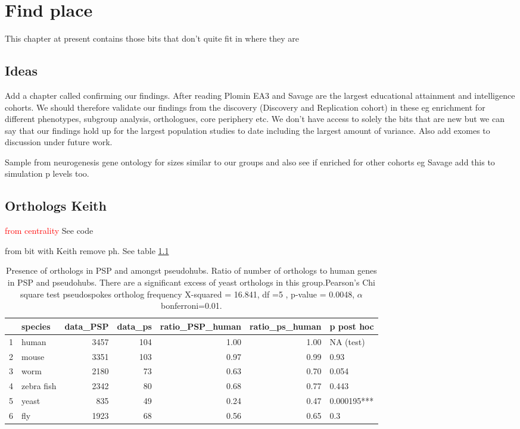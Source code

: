 \chapter{Find place}



This chapter at present contains those bits that don't quite fit in where they are

\section{Ideas}

Add a chapter called confirming our findings. After reading Plomin EA3 and Savage are the largest educational attainment and intelligence cohorts. We should therefore validate our findings from the discovery (Discovery and Replication cohort) in these eg enrichment for different phenotypes, subgroup analysis, orthologues, core periphery etc. We don't have access to solely the bits that are new but we can say that our findings hold up for the largest population studies to date including the largest amount of variance. Also add exomes to discussion under future work. 

Sample from neurogenesis gene ontology for sizes similar to our groups and also see if enriched for other cohorts eg Savage
add this to simulation p levels too. 

\section{Orthologs Keith}
\textcolor{red}{from centrality}
See code %

from bit with Keith remove ph. See table \ref{tab:orthologs_pseudospokes}
\begin{table}[ht]
\centering
\begin{tabular}{rlrrrrl}
  \hline
 & species & data\_PSP & data\_ps & ratio\_PSP\_human & ratio\_ps\_human & p post hoc \\ 
  \hline
1 & human & 3457 & 104 & 1.00 & 1.00 & NA (test) \\ 
  2 & mouse & 3351 & 103 & 0.97 & 0.99 & 0.93 \\ 
  3 & worm & 2180 &  73 & 0.63 & 0.70 & 0.054 \\
  4 & zebra fish & 2342 &  80 & 0.68 & 0.77 &0.443\\ 
  5 & yeast & 835 &  49 & 0.24 & 0.47 &0.000195*** \\ 
  6 & fly & 1923 &  68 & 0.56 & 0.65 &0.3\\ 
   \hline
\end{tabular}
\caption{Presence of orthologs in PSP and amongst pseudohubs. Ratio of number of orthologs to human genes in PSP and pseudohubs. There are a significant excess of yeast orthologs in this group.Pearson's Chi square test pseudospokes ortholog frequency X-squared = 16.841, df =5 , p-value = 0.0048, $\alpha$ bonferroni=0.01.}
\label{tab:orthologs_pseudospokes}
\end{table}


